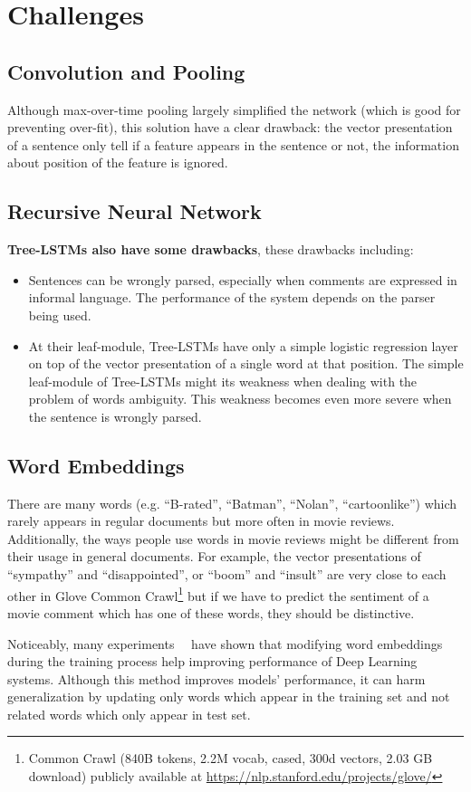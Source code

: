 \section{Challenges}
\subsection{Convolution and Pooling}
Although max-over-time pooling largely simplified the network (which is good for preventing over-fit), this solution have a clear drawback: the vector presentation of a sentence only tell if a feature appears in the sentence or not, the information about position of the feature is ignored.

\subsection{Recursive Neural Network}
\textbf{Tree-LSTMs also have some drawbacks}, these drawbacks including:
\begin{itemize}
	\item Sentences can be wrongly parsed, especially when comments are expressed in informal language.
	The performance of the system depends on the parser being used.
	\item At their leaf-module, Tree-LSTMs have only a simple logistic regression layer on top of the vector presentation of a single word at that position.
	The simple leaf-module of Tree-LSTMs might its weakness when dealing with the problem of words ambiguity.
	This weakness becomes even more severe when the sentence is wrongly parsed. 
\end{itemize}

\subsection{Word Embeddings}
There are many words (e.g. ``B-rated'', ``Batman'', ``Nolan'', ``cartoonlike'') which rarely appears in regular documents but more often in movie reviews.
Additionally, the ways people use words in movie reviews might be different from their usage in general documents.
For example, the vector presentations of ``sympathy'' and ``disappointed'', or ``boom'' and ``insult'' are very close to each other in Glove Common Crawl\footnote{Common Crawl (840B tokens, 2.2M vocab, cased, 300d vectors, 2.03 GB download) publicly available at \url{https://nlp.stanford.edu/projects/glove/}} but if we have to predict the sentiment of a movie comment which has one of these words, they should be distinctive.

Noticeably, many experiments~\cite{treeLSTM}~\cite{KimCNN} have shown that modifying word embeddings during the training process help improving performance of Deep Learning systems.
Although this method improves models' performance, it can harm generalization by updating only words which appear in the training set and not related words which only appear in test set.